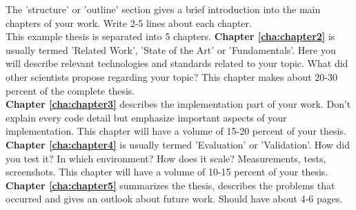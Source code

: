The 'structure' or 'outline' section gives a brief introduction into the main chapters of your work. Write 2-5 lines about each chapter.\\
This example thesis is separated into 5 chapters.
\textbf{Chapter \ref{cha:chapter2}} is usually termed 'Related Work', 'State of the Art' or 'Fundamentals'. Here you will describe relevant technologies and standards related to your topic. What did other scientists propose regarding your topic? This chapter makes about 20-30 percent of the complete thesis.
\\
\textbf{Chapter \ref{cha:chapter3}} describes the implementation part of your work. Don't explain every code detail but emphasize important aspects of your implementation. This chapter will have a volume of 15-20 percent of your thesis.
\\
\textbf{Chapter \ref{cha:chapter4}} is usually termed 'Evaluation' or 'Validation'. How did you test it? In which environment? How does it scale? Measurements, tests, screenshots. This chapter will have a volume of 10-15 percent of your thesis.
\\
\textbf{Chapter \ref{cha:chapter5}} summarizes the thesis, describes the problems that occurred and gives an outlook about future work. Should have about 4-6 pages.